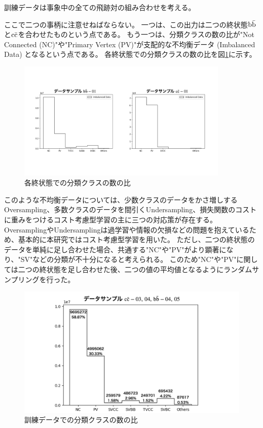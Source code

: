 訓練データは事象中の全ての飛跡対の組み合わせを考える。

ここで二つの事柄に注意せねばならない。
一つは、この出力は二つの終状態$\rm b\bar{b}$と$\rm c\bar{c}$を合わせたものという点である。
もう一つは、分類クラスの数の比が"Not Connected (NC)"や"Primary Vertex (PV)"が支配的な不均衡データ (Imbalanced Data) となるという点である。
各終状態での分類クラスの数の比を図\ref{3-3-2-1ImbalancedData}に示す。

\begin{figure}[htbp]
 \centering
 \includegraphics[trim = 100 200 100 150, width=0.9\textwidth, clip]{Figure/3Networks/3-3-2-1ImbalancedData.png}
 \caption{各終状態での分類クラスの数の比}
 \label{3-3-2-1ImbalancedData}
\end{figure}

このような不均衡データについては、少数クラスのデータをかさ増しするOversampling、多数クラスのデータを間引くUndersampling、損失関数のコストに重みをつけるコスト考慮型学習の主に三つの対応策が存在する。
OversamplingやUndersamplingは過学習や情報の欠損などの問題を抱えているため、基本的に本研究ではコスト考慮型学習を用いた。
ただし、二つの終状態のデータを単純に足し合わせた場合、共通する"NC"や"PV"がより顕著になり、"SV"などの分類が不十分になると考えられる。
このため"NC"や"PV"に関しては二つの終状態を足し合わせた後、二つの値の平均値となるようにランダムサンプリングを行った。

\begin{figure}[htbp]
 \centering
 \includegraphics[width=1.0\textwidth]{Figure/3Networks/3-3-2-2ImbalancedData.png}
 \caption{訓練データでの分類クラスの数の比}
 \label{3-3-2-2ImbalancedData}
\end{figure}

